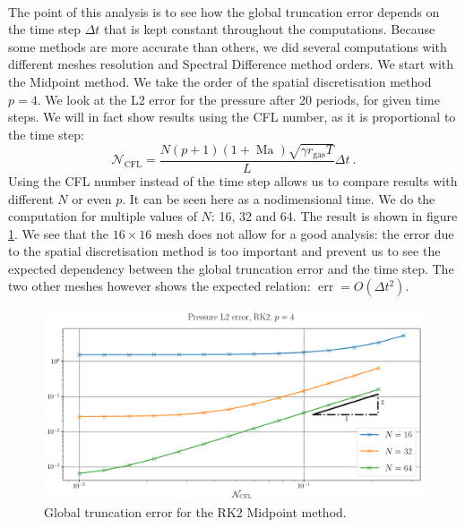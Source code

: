       \paragraph{}
      The point of this analysis is to see how the global truncation error depends on the time step $\Delta t$ that is kept constant throughout the computations.
      Because some methods are more accurate than others, we did several computations with different meshes resolution and Spectral Difference method orders.
      We start with the Midpoint method.
      We take the order of the spatial discretisation method $p = 4$.
      We look at the L2 error for the pressure after 20 periods, for given time steps.
      We will in fact show results using the CFL number, as it is proportional to the time step:
      \begin{equation}
        \mathcal{N}_\textrm{CFL} = \frac{N \left(p + 1\right) \left(1 + \operatorname{Ma}\right) \sqrt{\gamma r_\textrm{gas} T}}{L} \Delta t\ .
      \end{equation}
      Using the CFL number instead of the time step allows us to compare results with different $N$ or even $p$.
      It can be seen here as a nodimensional time.
      We do the computation for multiple values of $N$: 16, 32 and 64.
      The result is shown in figure \ref{fig:covo_rk2}.
      We see that the $16\times16$ mesh does not allow for a good analysis: the error due to the spatial discretisation method is too important and prevent us to see the expected dependency between the global truncation error and the time step.
      The two other meshes however shows the expected relation: $\operatorname{err} = O\left(\Delta t^2\right)$.

      \begin{figure}
        \centering
        \includegraphics[width=\textwidth]{figures/covo_rk2.png}
        \caption{Global truncation error for the RK2 Midpoint method.}
        \label{fig:covo_rk2}
      \end{figure}

